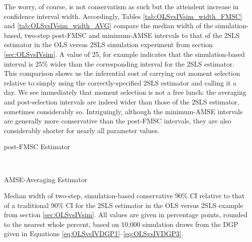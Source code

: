 The worry, of course, is not conservatism as such but the attendent increase in confidence interval width.
Accordingly, Tables \ref{tab:OLSvsIVsim_width_FMSC} and \ref{tab:OLSvsIVsim_width_AVG} compare the median width of the simulation-based, two-step post-FMSC and minimum-AMSE intervals to that of the 2SLS estimator in the OLS versus 2SLS simulation experiment from section \ref{sec:OLSvsIVsim}.
A value of 25, for example indicates that the simulation-based interval is 25\% wider than the corresponding interval for the 2SLS estimator.
This comparison shows us the inferential cost of carrying out moment selection relative to simply using the correctly-specified 2SLS estimator and calling it a day.
We see immediately that moment selection is not a free lunch: the averaging and post-selection intervals are indeed wider than those of the 2SLS estimator, sometimes considerably so.
Intriguingly, although the minimum-AMSE intervals are generally more conservative than the post-FMSC intervals, they are also considerably shorter for nearly all parameter values.
\begin{table}[h]
\footnotesize
\centering
	\begin{subtable}{0.48\textwidth}
		\caption{post-FMSC Estimator}
		
		\label{tab:OLSvsIVsim_width_FMSC}
	\end{subtable}	
	~
	\begin{subtable}{0.48\textwidth}
		\caption{AMSE-Averaging Estimator}
		
		\label{tab:OLSvsIVsim_width_AVG}
	\end{subtable}
	\caption{Median width of two-step, simulation-based conservative $90\%$ CI relative to that of a traditional 90\% CI for the 2SLS estimator in the OLS versus 2SLS example from section \ref{sec:OLSvsIVsim}. All values are given in percentage points, rounded to the nearest whole percent, based on 10,000 simulation draws from the DGP given in Equations \ref{eq:OLSvsIVDGP1}--\ref{eq:OLSvsIVDGP3}.}
\end{table}

